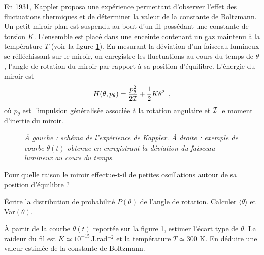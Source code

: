 En 1931, Kappler proposa une expérience permettant d'observer l'effet des fluctuations thermiques et de déterminer la valeur de la constante de Boltzmann. Un petit miroir plan est suspendu au bout d'un fil possédant une constante de torsion $K$. L'ensemble est placé dans une enceinte contenant un gaz maintenu à la température $T$ (voir la figure \ref{FigKappler}). En mesurant la déviation d'un faisceau lumineux se réfléchissant sur le miroir, on enregistre les fluctuations au cours du temps de $\theta$, l'angle de rotation du miroir par rapport à sa position d'équilibre. L'énergie du miroir est
$$
H(\theta, p_{\theta})=\frac{p_{\theta}^2}{2 \cal I}+
\frac{1}{2}K\theta^2 \enspace,
$$
où $p_{\theta}$ est l'impulsion généralisée associée à la rotation angulaire et $\cal I$ le moment d'inertie du miroir.


\begin{figure}[h]
\begin{center}
\caption{\it \`A gauche : schéma de l'expérience de Kappler. \`A
  droite : exemple de courbe $\theta(t)$ obtenue en enregistrant la
  déviation du faisceau lumineux au cours du temps.\label{FigKappler}}
\end{center}
\end{figure}


\question
Pour quelle raison le miroir effectue-t-il de petites oscillations autour de sa position d'équilibre ? 

\question
\'Ecrire la distribution de probabilité $P(\theta)$ de l'angle de rotation.  Calculer $\langle {\theta} \rangle$ et Var$(\theta)$.

\question
\`A partir de la courbe $\theta(t)$ reportée sur la figure \ref{FigKappler}, estimer l'écart type de $\theta$. La raideur du fil est $K\simeq 10^{-15}$\,J.rad$^{-2}$ et la température $T\simeq 300$ K. En déduire une valeur estimée de la constante de Boltzmann. 
